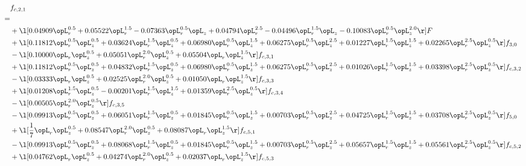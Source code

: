 \begin{alignat}{2} 
\label{eq:f_21_2} 
& f_{c,2,1} \nonumber \\ 
 = \\ 
& + \l[  0.04909 \opL_r^{0.5} +  0.05522 \opL_r^{1.5}   -0.07363 \opL_r^{0.5} \opL_z +  0.04794 \opL_r^{2.5}   -0.04496 \opL_r^{1.5} \opL_z   -0.10083 \opL_r^{0.5} \opL_z^{2.0}  \r] F \nonumber \\ 
& + \l[  0.11812 \opL_r^{0.5} \opL_z^{0.5} +  0.03624 \opL_r^{1.5} \opL_z^{0.5} +  0.06980 \opL_r^{0.5} \opL_z^{1.5} +  0.06275 \opL_r^{0.5} \opL_z^{2.5} +  0.01227 \opL_r^{1.5} \opL_z^{1.5} +  0.02265 \opL_r^{2.5} \opL_z^{0.5}  \r] f_{3,0} \nonumber \\ 
& - \l[  0.10000 \opL_r \opL_z^{0.5} +  0.05051 \opL_r^{2.0} \opL_z^{0.5} +  0.05504 \opL_r \opL_z^{1.5}  \r] f_{c,3,1} \nonumber \\ 
& + \l[  0.11812 \opL_r^{0.5} \opL_z^{0.5} +  0.04832 \opL_r^{1.5} \opL_z^{0.5} +  0.06980 \opL_r^{0.5} \opL_z^{1.5} +  0.06275 \opL_r^{0.5} \opL_z^{2.5} +  0.01026 \opL_r^{1.5} \opL_z^{1.5} +  0.03398 \opL_r^{2.5} \opL_z^{0.5}  \r] f_{c,3,2} \nonumber \\ 
& - \l[  0.03333 \opL_r \opL_z^{0.5} +  0.02525 \opL_r^{2.0} \opL_z^{0.5} +  0.01050 \opL_r \opL_z^{1.5}  \r] f_{c,3,3} \nonumber \\ 
& + \l[  0.01208 \opL_r^{1.5} \opL_z^{0.5}   -0.00201 \opL_r^{1.5} \opL_z^{1.5} +  0.01359 \opL_r^{2.5} \opL_z^{0.5}  \r] f_{c,3,4} \nonumber \\ 
& - \l[  0.00505 \opL_r^{2.0} \opL_z^{0.5}  \r] f_{c,3,5} \nonumber \\ 
& - \l[  0.09913 \opL_r^{0.5} \opL_z^{0.5} +  0.06051 \opL_r^{1.5} \opL_z^{0.5} +  0.01845 \opL_r^{0.5} \opL_z^{1.5} +  0.00703 \opL_r^{0.5} \opL_z^{2.5} +  0.04725 \opL_r^{1.5} \opL_z^{1.5} +  0.03708 \opL_r^{2.5} \opL_z^{0.5}  \r] f_{5,0} \nonumber \\ 
& + \l[ \frac{1}{7} \opL_r \opL_z^{0.5} +  0.08547 \opL_r^{2.0} \opL_z^{0.5} +  0.08087 \opL_r \opL_z^{1.5}  \r] f_{c,5,1} \nonumber \\ 
& - \l[  0.09913 \opL_r^{0.5} \opL_z^{0.5} +  0.08068 \opL_r^{1.5} \opL_z^{0.5} +  0.01845 \opL_r^{0.5} \opL_z^{1.5} +  0.00703 \opL_r^{0.5} \opL_z^{2.5} +  0.05657 \opL_r^{1.5} \opL_z^{1.5} +  0.05561 \opL_r^{2.5} \opL_z^{0.5}  \r] f_{c,5,2} \nonumber \\ 
& + \l[  0.04762 \opL_r \opL_z^{0.5} +  0.04274 \opL_r^{2.0} \opL_z^{0.5} +  0.02037 \opL_r \opL_z^{1.5}  \r] f_{c,5,3} \nonumber \\ 

\end{alignat}
